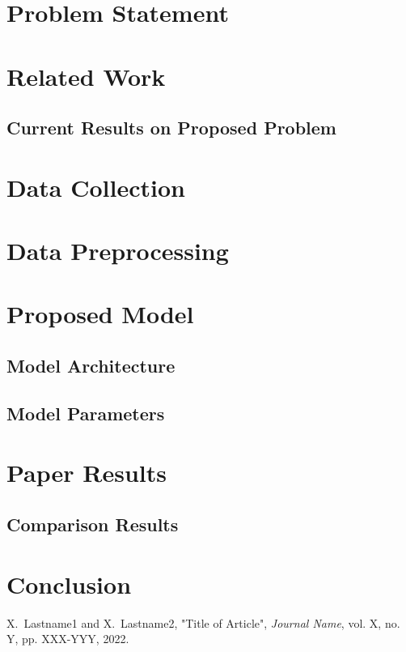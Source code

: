 \documentclass[journal]{IEEEtran}
\begin{document}
\section{Problem Statement}
\lipsum[1] %

\section{Related Work}
\lipsum[1] %

\subsection{Current Results on Proposed Problem}
\lipsum[1] %

\section{Data Collection}
\lipsum[1] %

\section{Data Preprocessing}
\lipsum[1] %

\section{Proposed Model}
\lipsum[1] %

\subsection{Model Architecture}
\lipsum[1] %

\subsection{Model Parameters}
\lipsum[1] %

\section{Paper Results}
\lipsum[1] %

\subsection{Comparison Results}
\lipsum[1] %

\section{Conclusion}
\lipsum[1] %

\begin{thebibliography}{1}

X.~Lastname1 and X.~Lastname2, "Title of Article", \emph{Journal Name}, vol. X, no. Y, pp. XXX-YYY, 2022.
\end{thebibliography}
\end{document}
